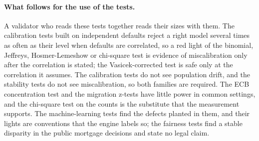 \paragraph{What follows for the use of the tests.} A validator who reads these tests together reads their sizes with them. The calibration tests built on independent defaults reject a right model several times as often as their level when defaults are correlated, so a red light of the binomial, Jeffreys, Hosmer-Lemeshow or chi-square test is evidence of miscalibration only after the correlation is stated; the Vasicek-corrected test is safe only at the correlation it assumes. The calibration tests do not see population drift, and the stability tests do not see miscalibration, so both
families are required. The ECB concentration test and the migration z-tests have little power in common settings, and the chi-square test on the counts is the substitute that the measurement supports. The machine-learning tests find the defects planted in them, and their lights are conventions that the engine labels so; the fairness tests find a stable disparity in the public mortgage decisions and state no legal claim.
